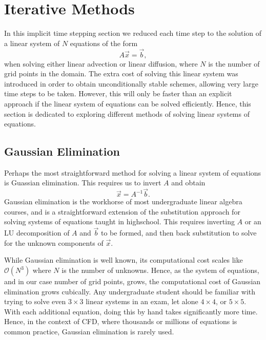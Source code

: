 \chapter{Iterative Methods}
In this implicit time stepping section we reduced each time step to the solution of a linear system of $N$ equations of the form 
\begin{equation}
	A \vec{x} = \vec{b},
\end{equation}
when solving either linear advection or linear diffusion, where $N$ is the number of grid points in the domain. The extra cost of solving this linear system was introduced in order to obtain unconditionally stable schemes, allowing very large time steps to be taken. However, this will only be faster than an explicit approach if the linear system of equations can be solved efficiently. Hence, this section is dedicated to exploring different methods of solving linear systems of equations.

\section{Gaussian Elimination}
Perhaps the most straightforward method for solving a linear system of equations is Guassian elimination. This requires us to invert $A$ and obtain
\begin{equation}
	 \vec{x} = A^{-1} \vec{b}.
\end{equation}
Gaussian elimination is the workhorse of most undergraduate linear algebra courses, and is a straightforward extension of the substitution approach for solving systems of equations taught in highschool. This requires inverting $A$ or an LU decomposition of $A$ and $\vec{b}$ to be formed, and then back substitution to solve for the unknown components of $\vec{x}$.

While Gaussian elimination is well known, its computational cost scales like $\mathcal{O}(N^3)$ where $N$ is the number of unknowns. Hence, as the system of equations, and in our case number of grid points, grows, the computational cost of Gaussian elimination grows cubically. Any undergraduate student should be familiar with trying to solve even $3 \times 3$ linear systems in an exam, let alone $4 \times 4$, or $5 \times 5$. With each additional equation, doing this by hand takes significantly more time. Hence, in the context of CFD, where thousands or millions of equations is common practice, Gaussian elimination is rarely used.

